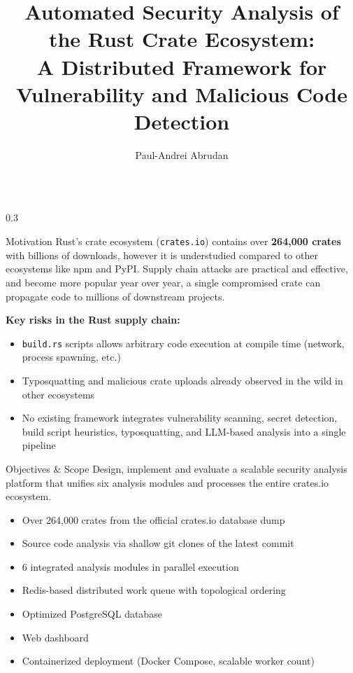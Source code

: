 \documentclass[final]{beamer}
\title{Automated Security Analysis of the Rust Crate Ecosystem:\\
A Distributed Framework for Vulnerability and Malicious Code Detection}
\author{Paul-Andrei Abrudan}
\institute[UVT]{West University of Timi\c{s}oara - Faculty of Computer Science\\Supervisor: Lect.\ Dr.\ Ing.\ Darius Galis}
\begin{document}
\begin{frame}[fragile]

\begin{columns}[t]

\separatorcolumn

\begin{column}{0.3\paperwidth}

\begin{block}{Motivation}
    Rust's crate ecosystem (\texttt{crates.io}) contains over \textbf{264,000 crates} with billions of downloads, however it is understudied compared to other ecosystems like npm and PyPI.
    Supply chain attacks are practical and effective, and become more popular year over year, a single compromised crate can propagate code to millions of downstream projects.

    \bigskip
    \textbf{Key risks in the Rust supply chain:}
    \begin{itemize}
        \item \texttt{build.rs} scripts allows arbitrary code execution at compile time (network, process spawning, etc.)
        \item Typosquatting and malicious crate uploads already observed in the wild in other ecosystems
        \item No existing framework integrates vulnerability scanning, secret detection, build script heuristics, typosquatting, and LLM-based analysis into a single pipeline
    \end{itemize}
\end{block}

\begin{block}{Objectives \& Scope}
    Design, implement and evaluate a scalable security analysis platform that unifies six analysis modules and processes the entire crates.io ecosystem.

    \bigskip
    \begin{itemize}
        \item Over 264,000 crates from the official crates.io database dump
        \item Source code analysis via shallow git clones of the latest commit
        \item 6 integrated analysis modules in parallel execution
        \item Redis-based distributed work queue with topological ordering
        \item Optimized PostgreSQL database
        \item Web dashboard
        \item Containerized deployment (Docker Compose, scalable worker count)
    \end{itemize}
\end{block}


\end{column}
\end{columns}
\end{frame}
\end{document}
